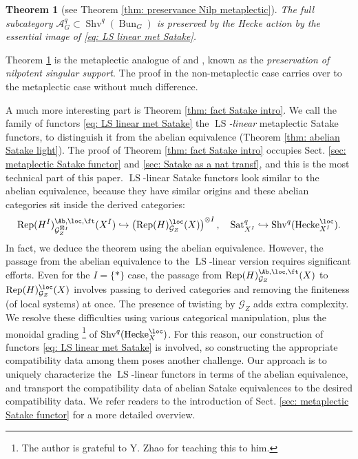 \documentclass[10pt]{amsart}
\newtheorem{thm}[subsubsection]{Theorem}
\theoremstyle{remark}
\newcommand{\on}{\operatorname}
\newcommand{\cA}{\mathcal{A}}
\newcommand{\cG}{\mathcal{G}}
\newcommand{\Rep}{\on{Rep}}
\newcommand{\Shv}{\on{Shv}}
\newcommand{\LS}{\on{LS}}
\newcommand{\Sat}{\on{Sat}}
\newcommand{\Hecke}{\on{Hecke}}
\newcommand{\Bun}{\on{Bun}}
\begin{document}
\begin{thm}[see Theorem \ref{thm: preservance Nilp metaplectic}]\label{thm: preservance intro}
    The full subcategory $\cA^q_G\subset \Shv^q(\Bun_G)$ is preserved by the Hecke action by the essential image of \eqref{eq: LS linear met Satake}.
\end{thm}

Theorem \ref{thm: preservance intro} is the metaplectic analogue of \cite[Theorem 5.1]{NY} and \cite[Theorem B.5.2]{GKRV}, known as the \emph{preservation of nilpotent singular support}. The proof in the non-metaplectic case carries over to the metaplectic case without much difference.
\medskip

A much more interesting part is Theorem \ref{thm: fact Satake intro}. We call the family of functors \eqref{eq: LS linear met Satake} the \emph{$\LS$-linear} metaplectic Satake functors, to distinguish it from the abelian equivalence (Theorem \ref{thm: abelian Satake light}). The proof of Theorem \ref{thm: fact Satake intro} occupies Sect. \ref{sec: metaplectic Satake functor} and \ref{sec: Satake as a nat transf}, and this is the most technical part of this paper. $\LS$-linear Satake functors look similar to the abelian equivalence, because they have similar origins and these abelian categories sit inside the derived categories:
\[\Rep(H^I)^{\Ab,\loc,\ft}_{\cG^{\boxtimes I}_Z}(X^I)\hookrightarrow\left(\Rep(H)^{\loc}_{\cG_Z}(X)\right)^{\otimes I},\quad \Sat^q_{X^I}\hookrightarrow \Shv^q(\Hecke^{\loc}_{X^I}).\]
In fact, we deduce the theorem using the abelian equivalence. However, the passage from the abelian equivalence to the $\LS$-linear version requires significant efforts. Even for the $I=\{*\}$ case, the passage from $\Rep(H)^{\Ab,\loc,\ft}_{\cG_Z}(X)$ to $\Rep(H)^{\loc}_{\cG_Z}(X)$ involves passing to derived categories and removing the finiteness (of local systems) at once. The presence of twisting by $\cG_Z$ adds extra complexity. We resolve these difficulties using various categorical manipulation, plus the monoidal grading \footnote{The author is grateful to Y. Zhao for teaching this to him.} of $\Shv^q(\Hecke^{\loc}_X)$. For this reason, our construction of functors \eqref{eq: LS linear met Satake} is involved, so constructing the appropriate compatibility data among them poses another challenge. Our approach is to uniquely characterize the $\LS$-linear functors in terms of the abelian equivalence, and transport the compatibility data of abelian Satake equivalences to the desired compatibility data. We refer readers to the introduction of Sect. \ref{sec: metaplectic Satake functor} for a more detailed overview.
\end{document}
